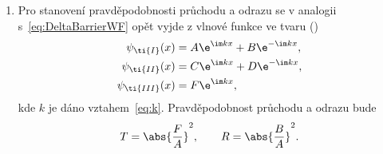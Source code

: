 \begin{solution}
\begin{enumerate}
		\begin{figure}[!htbp]
            \begin{subfigure}{0.32\linewidth}
                \centering{}
            \end{subfigure}
            \begin{subfigure}{0.32\linewidth}
                \centering{}
            \end{subfigure}
            \begin{subfigure}{0.32\linewidth}
                \centering{}
            \end{subfigure}
			\label{fig:DoubleDeltaWaveFunction}
		\end{figure}		

		Normalizované vlnové funkce pro tři různé hodnoty $K$ jsou zobrazeny na obrázku~\ref{fig:DoubleDeltaWaveFunction}.
		
	\item
		Pro stanovení pravděpodobnosti průchodu a odrazu se v analogii s~\eqref{eq:DeltaBarrierWF} opět vyjde z vlnové funkce ve tvaru ()
		\begin{subequations}
			\begin{align}
				\psi_{\ti{I}}(x)
					&=A\e^{\im kx}+B\e^{-\im k x},\\
				\psi_{\ti{II}}(x)
					&=C\e^{\im kx}+D\e^{-\im k x},\\
				\psi_{\ti{III}}(x)
					&=F\e^{\im kx},
			\end{align}
		\end{subequations}
		kde $k$ je dáno vztahem~\eqref{eq:k}.
		Pravděpodobnost průchodu a odrazu bude
		\begin{equation}
            T=\abs{\frac{F}{A}}^{2},\qquad 
            R=\abs{\frac{B}{A}}^{2}.
		\end{equation}
		

\end{enumerate}
\end{solution}
